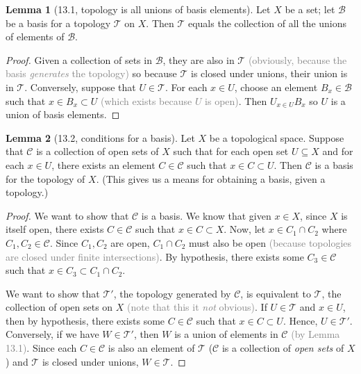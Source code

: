 \documentclass{article}
\newcommand{\nline}{\vspace*{0.5\baselineskip}}
\newcommand{\com}[1]{\textcolor{grey}{#1}}
\theoremstyle{definition}
\newtheorem{lemma}{Lemma}[subsection]
\begin{document}
\begin{flushleft}
\begin{lemma}[13.1, topology is all unions of basis elements]
Let $X$ be a set; let $\mathcal{B}$ be a basis for a topology $\mathcal{T}$ on $X$. Then $\mathcal{T}$ equals the collection of all the unions of elements of $\mathcal{B}$.
\end{lemma}

\begin{proof}
Given a collection of sets in $\mathcal{B}$, they are also in $\mathcal{T}$ \com{(obviously, because the basis \textit{generates} the topology)} so because $\mathcal{T}$ is closed under unions, their union is in $\mathcal{T}$. Conversely, suppose that $U \in \mathcal{T}$. For each $x \in U$, choose an element $B_x \in \mathcal{B}$ such that $x \in B_x \subset U$ \com{(which exists because $U$ is open)}. Then $U_{x \in U} B_x$ so $U$ is a union of basis elements.
\end{proof}

\begin{lemma}[13.2, conditions for a basis]
Let $X$ be a topological space. Suppose that $\mathcal{C}$ is a collection of open sets of $X$ such that for each open set $U \subseteq X$ and for each $x \in U$, there exists an element $C \in \mathcal{C}$ such that $x \in C \subset U$. Then $\mathcal{C}$ is a basis for the topology of $X$. (This gives us a means for obtaining a basis, given a topology.)
\end{lemma}

\begin{proof}
We want to show that $\mathcal{C}$ is a basis. We know that given $x \in X$, since $X$ is itself open, there exists $C \in \mathcal{C}$ such that $x \in C \subset X$. Now, let $x \in C_1 \cap C_2$ where $C_1, C_2 \in \mathcal{C}$. Since $C_1, C_2$ are open, $C_1 \cap C_2$ must also be open \com{(because topologies are closed under finite intersections)}. By hypothesis, there exists some $C_3 \in \mathcal{C}$ such that $x \in C_3 \subset C_1 \cap C_2$.

\nline

We want to show that $\mathcal{T}'$, the topology generated by $\mathcal{C}$, is equivalent to $\mathcal{T}$, the collection of open sets on $X$ \com{(note that this it \textit{not} obvious)}. If $U \in \mathcal{T}$ and $x \in U$, then by hypothesis, there exists some $C \in \mathcal{C}$ such that $x \in C \subset U$. Hence, $U \in \mathcal{T}'$. Conversely, if we have $W \in \mathcal{T}'$, then $W$ is a union of elements in $\mathcal{C}$ \com{(by Lemma 13.1)}. Since each $C \in \mathcal{C}$ is also an element of $\mathcal{T}$ ($\mathcal{C}$ is a collection of \textit{open sets} of $X$) and $\mathcal{T}$ is closed under unions, $W \in \mathcal{T}$.
\end{proof}


\end{flushleft}
\end{document}
